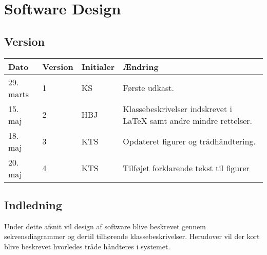 \chapter{Software Design} \label{ch:SwDesign}

\section*{Version}
\begin{table}[h]
	\centering
	\begin{tabularx}{\textwidth - 2cm}{|l|l|l|X|}
	\hline
	Dato	& Version	& Initialer & Ændring	\\ \hline
	29. marts & 1 & KS & Første udkast. \\ \hline 
	15. maj & 2 & HBJ & Klassebeskrivelser indskrevet i LaTeX samt andre mindre rettelser. \\\hline 
	18. maj & 3 & KTS & Opdateret figurer og trådhåndtering. \\\hline 
	20. maj & 4 & KTS & Tilføjet forklarende tekst til figurer \\\hline 
	\end{tabularx}
\end{table}

\section{Indledning}
Under dette afsnit vil design af software blive beskrevet gennem sekvensdiagrammer og dertil tilhørende klassebeskrivelser. Herudover vil der kort blive beskrevet hvorledes tråde håndteres i systemet.

\clearpage

\clearpage

\clearpage

